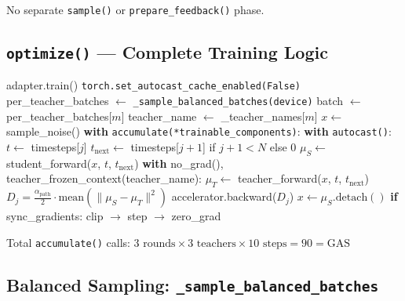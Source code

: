\documentclass[11pt]{article}
\begin{document}
No separate \texttt{sample()} or \texttt{prepare\_feedback()} phase.

\subsection{\texttt{optimize()} --- Complete Training Logic}

\begin{algorithm}[H]
\caption{DiffusionOPD optimize() --- Algorithm 1}
\begin{algorithmic}
\STATE adapter.train()
\STATE \texttt{torch.set\_autocast\_cache\_enabled(False)} 
    \STATE per\_teacher\_batches $\leftarrow$ \texttt{\_sample\_balanced\_batches(device)}
    \STATE {}
        \STATE batch $\leftarrow$ per\_teacher\_batches[$m$]
        \STATE teacher\_name $\leftarrow$ \_teacher\_names[$m$]
        \STATE $x \leftarrow$ sample\_noise() 
            \STATE \textbf{with} \texttt{accumulate(*trainable\_components)}:
            \STATE \quad \textbf{with} \texttt{autocast()}:
            \STATE \quad\quad $t \leftarrow$ timesteps[$j$]
            \STATE \quad\quad $t_\text{next} \leftarrow$ timesteps[$j+1$] if $j+1 < N$ else 0
            \STATE \quad\quad $\mu_S \leftarrow$ student\_forward($x$, $t$, $t_\text{next}$) 
            \STATE \quad\quad \textbf{with} no\_grad(), teacher\_frozen\_context(teacher\_name):
            \STATE \quad\quad\quad $\mu_T \leftarrow$ teacher\_forward($x$, $t$, $t_\text{next}$) 
            \STATE \quad\quad $D_j = \tfrac{\alpha_\text{path}}{2} \cdot \text{mean}(\|\mu_S - \mu_T\|^2)$
            \STATE \quad accelerator.backward($D_j$) 
            \STATE \quad $x \leftarrow \mu_S.\text{detach}()$ 
            \STATE \quad \textbf{if} sync\_gradients: clip $\to$ step $\to$ zero\_grad
        \ENDFOR
    \ENDFOR
\ENDFOR
\end{algorithmic}
\end{algorithm}

Total \texttt{accumulate()} calls: $3 \text{ rounds} \times 3 \text{ teachers} \times 10 \text{ steps} = 90 = \text{GAS}$ \checkmark

\subsection{Balanced Sampling: \texttt{\_sample\_balanced\_batches}}
\end{document}
